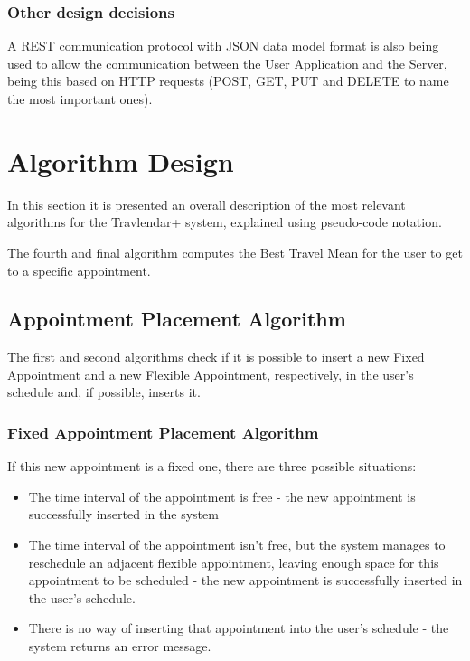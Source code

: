 \documentclass[12pt]{article}
\begin{document}
\subsubsection{Other design decisions}
A REST communication protocol with JSON data model format is also being used to allow the communication between the User Application and the Server, being this based on HTTP requests (POST, GET, PUT and DELETE to name the most important ones).

\section{Algorithm Design}
In this section it is presented an overall description of the most relevant algorithms for the Travlendar+ system, explained using pseudo-code notation.

The fourth and final algorithm computes the Best Travel Mean for the user to get to a specific appointment.

\subsection{Appointment Placement Algorithm}
The first and second algorithms check if it is possible to insert a new Fixed Appointment and a new Flexible Appointment, respectively, in the user's schedule and, if possible, inserts it.

\subsubsection{Fixed Appointment Placement Algorithm}

If this new appointment is a fixed one, there are three possible situations:
\begin{itemize}
    \item The time interval of the appointment is free - the new appointment is successfully inserted in the system
    \item The time interval of the appointment isn't free, but the system manages to reschedule an adjacent flexible appointment, leaving enough space for this appointment to be scheduled - the new appointment is successfully inserted in the user's schedule.
    \item There is no way of inserting that appointment into the user's schedule - the system returns an error message.
\end{itemize}
\end{document}
